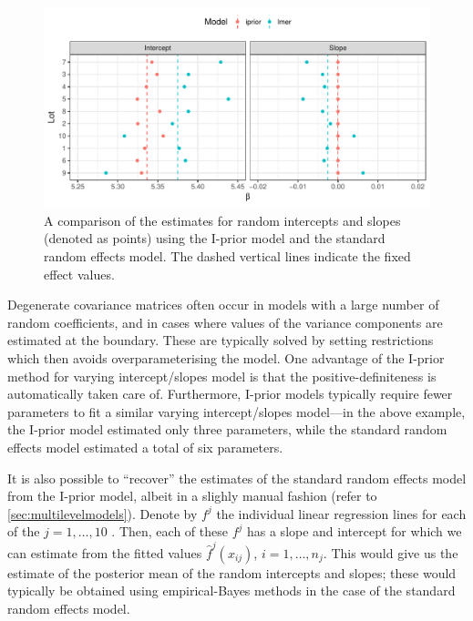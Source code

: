 \documentclass[showframe,11pt,twoside,openright]{report}\usepackage[]{graphicx}\usepackage[]{color}
\makeatletter
\def\maxwidth{ %
  \ifdim\Gin@nat@width>\linewidth
    \linewidth
  \else
    \Gin@nat@width
  \fi
}
\newenvironment{knitrout}{}{} %
\makeatother
\begin{document}
\begin{knitrout}
\color{fgcolor}\begin{figure}[htbp]

{\centering \includegraphics[width=\maxwidth]{figure/04-IGF_plot_beta-1} 

}

\caption[A comparison of the estimates for random intercepts and slopes (denoted as points) using the I-prior model and the standard random effects model]{A comparison of the estimates for random intercepts and slopes (denoted as points) using the I-prior model and the standard random effects model. The dashed vertical lines indicate the fixed effect values.}\label{fig:IGF.plot.beta}
\end{figure}


\end{knitrout}

Degenerate covariance matrices often occur in models with a large number of random coefficients, and in cases where values of the variance components are estimated at the boundary.
These are typically solved by setting restrictions which then avoids overparameterising the model.
One advantage of the I-prior method for varying intercept/slopes model is that the positive-definiteness is automatically taken care of.
Furthermore, I-prior models typically require fewer parameters to fit a similar varying intercept/slopes model---in the above example, the I-prior model estimated only three parameters, while the standard random effects model estimated a total of six parameters.

It is also possible to ``recover'' the estimates of the standard random effects model from the I-prior model, albeit in a slighly manual fashion (refer to \cref{sec:multilevelmodels}).
Denote by $f^j$ the individual linear regression lines for each of the $j=1,\dots,10$ .
Then, each of these $f^j$ has a slope and intercept for which we can estimate from the fitted values $\hat f^j(x_{ij})$, $i=1,\dots,n_j$.
This would give us the estimate of the posterior mean of the random intercepts and slopes; these would typically be obtained using empirical-Bayes methods in the case of the standard random effects model.
\end{document}
